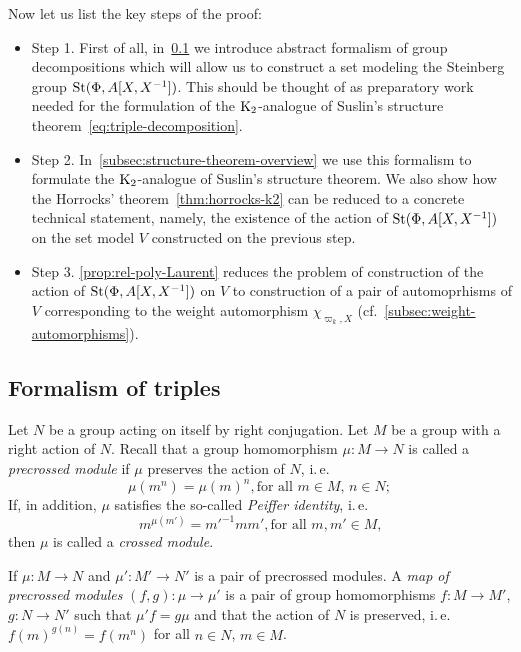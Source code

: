 Now let us list the key steps of the proof:
\begin{itemize}
    \item Step 1. First of all, in~\cref{subsec:triples} we introduce abstract formalism of group decompositions which will allow us to construct a set modeling the Steinberg group $\operatorname{St}(\Phi, A[X, X^{-1}])$.
                  This should be thought of as preparatory work needed for the formulation of the $\operatorname{K}_2$-analogue of Suslin's structure theorem~\eqref{eq:triple-decomposition}.
    \item Step 2. In~\cref{subsec:structure-theorem-overview} we use this formalism to formulate the $\operatorname{K}_2$-analogue of Suslin's structure theorem.
                  We also show how the Horrocks' theorem~\cref{thm:horrocks-k2} can be reduced to a concrete technical statement, namely, the existence of the action of $\operatorname{St}(\Phi, A[X, X^{-1}])$ on the set model $V$ constructed on the previous step.
    \item Step 3. \cref{prop:rel-poly-Laurent} reduces the problem of construction of the action of $\operatorname{St}(\Phi, A[X, X^{-1}])$ on $V$ to construction of a pair of automoprhisms of $V$
                  corresponding to the weight automorphism $\chi_{\varpi_k, X}$ (cf.~\cref{subsec:weight-automorphisms}).

\end{itemize}

\subsection{Formalism of triples}\label{subsec:triples}
Let $N$ be a group acting on itself by right conjugation.
Let $M$ be a group with a right action of $N$.
Recall that a group homomorphism $\mu\colon M \to N$ is called a \textit{precrossed module} if $\mu$ preserves the action of $N$, i.\,e.
\[\mu(m^n) = \mu(m)^n, \text{for all $m \in M$, $n\in N;$} \]
If, in addition, $\mu$ satisfies the so-called \textit{Peiffer identity}, i.\,e.
\[{m}^{\mu(m')} = {m'}^{-1} m m', \text{for all $m, m' \in M$,}\]
then $\mu$ is called a \textit{crossed module}.

If $\mu\colon M \to N$ and $\mu' \colon M' \to N'$ is a pair of precrossed modules.
A \textit{map of precrossed modules} $(f, g)\colon \mu \to \mu'$ is a pair of group homomorphisms $f\colon M \to M'$, $g\colon N \to N'$ such that
$\mu'f = g \mu$ and that the action of $N$ is preserved, i.\,e. ${f(m)}^{g(n)} = f(m^n)$ for all $n \in N$, $m \in M$.

